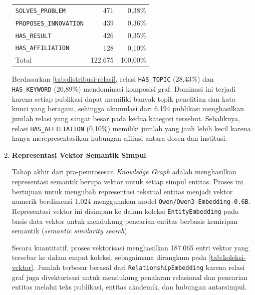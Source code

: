 \begin{enumerate}[label=(\alph*), leftmargin=*, itemsep=10pt]
\begin{longtable}{@{}lrr@{}}
              \texttt{SOLVES\_PROBLEM}      & 471     & 0,38\%                                                 \\
              \texttt{PROPOSES\_INNOVATION} & 439     & 0,36\%                                                 \\
              \texttt{HAS\_RESULT}          & 426     & 0,35\%                                                 \\
              \texttt{HAS\_AFFILIATION}     & 128     & 0,10\%                                                 \\
              \midrule
              Total                         & 122.675 & 100,00\%                                               \\
              \bottomrule
          \end{longtable}
          \endgroup

          \hspace*{0.75cm} Berdasarkan \ref{tab:distribusi-relasi}, relasi \texttt{HAS\_TOPIC} (28,43\%) dan \texttt{HAS\_KEYWORD} (20,89\%) mendominasi komposisi graf. Dominasi ini terjadi karena setiap publikasi dapat memiliki banyak topik penelitian dan kata kunci yang beragam, sehingga akumulasi dari 6.194 publikasi menghasilkan jumlah relasi yang sangat besar pada kedua kategori tersebut. Sebaliknya, relasi \texttt{HAS\_AFFILIATION} (0,10\%) memiliki jumlah yang jauh lebih kecil karena hanya merepresentasikan hubungan afiliasi antara dosen dan institusi.

    \item \textbf{Representasi Vektor Semantik Simpul}

          \hspace*{0.75cm} Tahap akhir dari pra-pemrosesan \textit{Knowledge Graph} adalah menghasilkan representasi semantik berupa vektor untuk setiap simpul entitas. Proses ini bertujuan untuk mengubah representasi tekstual entitas menjadi vektor numerik berdimensi 1.024 menggunakan model \texttt{Qwen/Qwen3-Embedding-0.6B}. Representasi vektor ini disimpan ke dalam koleksi \texttt{EntityEmbedding} pada basis data vektor untuk mendukung pencarian entitas berbasis kemiripan semantik (\textit{semantic similarity search}).

          \hspace*{0.75cm} Secara kuantitatif, proses vektorisasi menghasilkan 187.065 entri vektor yang tersebar ke dalam empat koleksi, sebagaimana dirangkum pada \ref{tab:koleksi-vektor}. Jumlah terbesar berasal dari \texttt{RelationshipEmbedding} karena relasi graf juga divektorisasi untuk mendukung penalaran relasional dan pencarian entitas melalui teks publikasi, entitas akademik, dan hubungan antarsimpul.


\end{enumerate}
